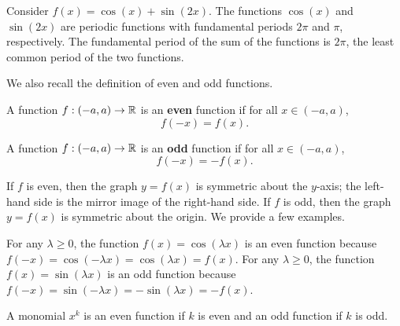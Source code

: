 \begin{example}
    Consider $f(x) = \cos(x) + \sin(2x)$. The functions $\cos(x)$ and $\sin(2x)$ are periodic functions with fundamental periods $2\pi$ and $\pi$, respectively. The fundamental period of the sum of the functions is $2\pi$, the least common period of the two functions.
\end{example}

We also recall the definition of even and odd functions.

\begin{definition}
    A function $f : (-a, a) \to \mathbb{R}$ is an \textbf{even} function if for all $x \in (-a, a)$,
    \[f(-x) = f(x).\]
\end{definition}

\begin{definition}
    A function $f : (-a, a) \to \mathbb{R}$ is an \textbf{odd} function if for all $x \in (-a, a)$,
    \[f(-x) = -f(x).\]
\end{definition}

If $f$ is even, then the graph $y = f(x)$ is symmetric about the $y$-axis; the left-hand side is the mirror image of the right-hand side. If $f$ is odd, then the graph $y = f(x)$ is symmetric about the origin. We provide a few examples.

\begin{example}[][2.6]
    For any $\lambda \geq 0$, the function $f(x) = \cos(\lambda x)$ is an even function because $f(-x) = \cos(-\lambda x) = \cos(\lambda x) = f(x)$. For any $\lambda \geq 0$, the function $f(x) = \sin(\lambda x)$ is an odd function because $f(-x) = \sin(-\lambda x) = -\sin(\lambda x) = -f(x)$.
\end{example}

\begin{example}[][2.7]
    A monomial $x^k$ is an even function if $k$ is even and an odd function if $k$ is odd.
\end{example}

